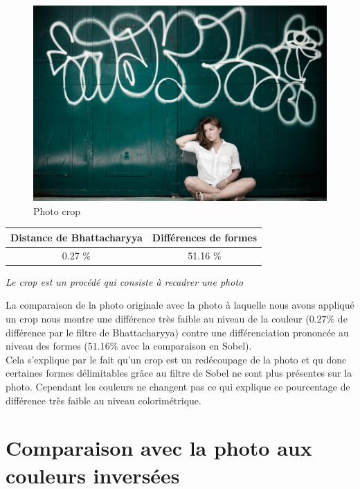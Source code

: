 \documentclass[]{article}
\begin{document}
\begin{figure}[htbp]
\centering
\includegraphics{photos/crop.jpg}
\caption{Photo crop}
\end{figure}

\begin{center}
\begin{tabular}{|c|c|}
  \hline
  Distance de Bhattacharyya & Différences de formes \\
  \hline
  0.27 \% & 51.16 \% \\
  \hline
\end{tabular}
\end{center}


\emph{Le crop est un procédé qui consiste à recadrer une photo}

La comparaison de la photo originale avec la photo à laquelle nous avons
appliqué un crop nous montre une différence très faible au niveau de la
couleur ($0.27 \%$ de différence par le filtre de Bhattacharyya) contre
une différenciation prononcée au niveau des formes ($51.16 \%$ avec la
comparaison en Sobel). \\
Cela s'explique par le fait qu'un crop est un redécoupage de la photo et qu
donc certaines formes délimitables grâce au filtre de Sobel ne sont plus
présentes sur la photo. Cependant les couleurs ne changent pas ce qui explique
ce pourcentage de différence très faible au niveau colorimétrique.

\newpage

\section{Comparaison avec la photo aux couleurs
inversées}\label{comparaison-avec-la-photo-aux-couleurs-inversuxe9es}
\end{document}
